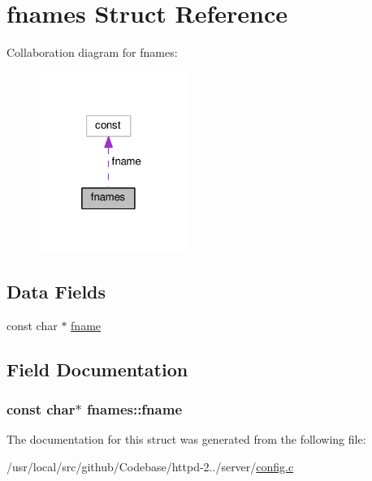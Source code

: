 \hypertarget{structfnames}{}\section{fnames Struct Reference}
\label{structfnames}


Collaboration diagram for fnames\+:
\nopagebreak
\begin{figure}[H]
\begin{center}
\leavevmode
\includegraphics[width=136pt]{structfnames__coll__graph}
\end{center}
\end{figure}
\subsection*{Data Fields}
\begin{DoxyCompactItemize}
\item 
const char $\ast$ \hyperlink{structfnames_a5615b55fc4c754e39009794fcb6aecba}{fname}
\end{DoxyCompactItemize}


\subsection{Field Documentation}
\subsubsection[{\texorpdfstring{fname}{fname}}]{\setlength{\rightskip}{0pt plus 5cm}const char$\ast$ fnames\+::fname}\hypertarget{structfnames_a5615b55fc4c754e39009794fcb6aecba}{}\label{structfnames_a5615b55fc4c754e39009794fcb6aecba}


The documentation for this struct was generated from the following file\+:\begin{DoxyCompactItemize}
\item 
/usr/local/src/github/\+Codebase/httpd-\/2../server/\hyperlink{config_8c}{config.\+c}\end{DoxyCompactItemize}
